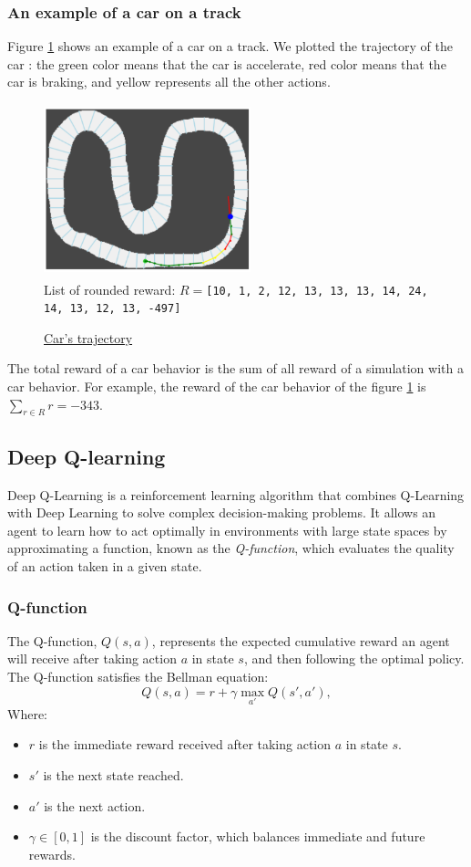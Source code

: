 \documentclass[11pt,a4paper]{article}
\newcounter{fig}
\newcommand{\mlist}[1]{\begin{itemize}[noitemsep,topsep=0pt]#1\end{itemize}}
\begin{document}
			\subsubsection*{An example of a car on a track}
Figure \ref{figure:env example} shows an example of a car on a track. We plotted the trajectory of the car : the green color means that the car is accelerate, red color means that the car is braking, and yellow represents all the other actions.
\begin{center}
	\begin{figure}[ht]
		\centering
		\includegraphics[width=6cm, height=5cm]{env_example.png}\\
		List of rounded reward: $R=$\texttt{[10, 1, 2, 12, 13, 13, 13, 14, 24, 14, 13, 12, 13, -497]}
		\caption{\underline{Car's trajectory}}
		\label{figure:env example}
	\end{figure}
\end{center}
The total reward of a car behavior is the sum of all reward of a simulation with a car behavior. For example, the reward of the car behavior of the figure \ref{figure:env example} is $\underset{r \in R}{\sum} r= -343$.


		\subsection*{Deep Q-learning}
Deep Q-Learning is a reinforcement learning algorithm that combines Q-Learning with Deep Learning to solve complex decision-making problems. It allows an agent to learn how to act optimally in environments with large state spaces by approximating a function, known as the \textit{Q-function}, which evaluates the quality of an action taken in a given state.
    
            \subsubsection*{Q-function}
The Q-function, $Q(s, a)$, represents the expected cumulative reward an agent will receive after taking action $a$ in state $s$, and then following the optimal policy. The Q-function satisfies the Bellman equation:
\[Q(s, a) = r + \gamma \max_{a'} Q(s', a'),\]
Where:
\mlist{
\item $r$ is the immediate reward received after taking action $a$ in state $s$.
\item $s'$ is the next state reached.
\item $a'$ is the next action.
\item $\gamma \in [0, 1]$ is the discount factor, which balances immediate and future rewards.
}
    
\end{document}
